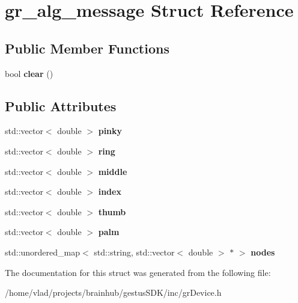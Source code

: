 \hypertarget{structgr__alg__message}{}\section{gr\+\_\+alg\+\_\+message Struct Reference}
\label{structgr__alg__message}
\subsection*{Public Member Functions}
\begin{DoxyCompactItemize}
\item 
\mbox{\label{structgr__alg__message_a2eca0bdd161d85e3915019782ab3c7d0}} 
bool {\bfseries clear} ()
\end{DoxyCompactItemize}
\subsection*{Public Attributes}
\begin{DoxyCompactItemize}
\item 
\mbox{\label{structgr__alg__message_affba38c037a598035da63f74b679ba7d}} 
std\+::vector$<$ double $>$ {\bfseries pinky}
\item 
\mbox{\label{structgr__alg__message_a41f038022b78c8177a0973ee0d904311}} 
std\+::vector$<$ double $>$ {\bfseries ring}
\item 
\mbox{\label{structgr__alg__message_ab8bf9a84283523061d9b7c81ad6275a9}} 
std\+::vector$<$ double $>$ {\bfseries middle}
\item 
\mbox{\label{structgr__alg__message_a386ca5c0b3cbb207e8d448b38c52a88b}} 
std\+::vector$<$ double $>$ {\bfseries index}
\item 
\mbox{\label{structgr__alg__message_a8273f9f907dbbd1807853632eec80920}} 
std\+::vector$<$ double $>$ {\bfseries thumb}
\item 
\mbox{\label{structgr__alg__message_aab7d06cfa17d559516adf6afd2bc7829}} 
std\+::vector$<$ double $>$ {\bfseries palm}
\item 
\mbox{\label{structgr__alg__message_ad3c2b4fc2608141605baa03b5c0e6f9a}} 
std\+::unordered\+\_\+map$<$ std\+::string, std\+::vector$<$ double $>$ $\ast$ $>$ {\bfseries nodes}
\end{DoxyCompactItemize}


The documentation for this struct was generated from the following file\+:\begin{DoxyCompactItemize}
\item 
/home/vlad/projects/brainhub/gestus\+S\+D\+K/inc/gr\+Device.\+h\end{DoxyCompactItemize}
